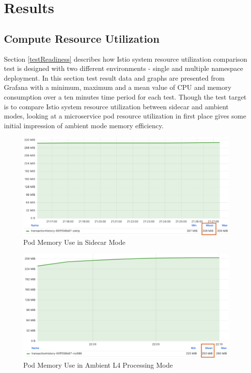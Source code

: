 \section{Results}
\label{resultSection}
\subsection{Compute Resource Utilization}
Section \ref{testReadiness} describes how Istio system resource utilization comparison test is designed with two different environments - single and multiple namespace deployment. In this section test result data and graphs are presented from Grafana with a minimum, maximum and a mean value of CPU and memory consumption over a ten minutes time period for each test. Though the test target is to compare Istio system resource utilization between sidecar and ambient modes, looking at a microservice pod resource utilization in first place gives some initial impression of ambient mode memory efficiency.

\begin{figure}[ht!]
  \centering
  \includegraphics[width=0.73\linewidth]{resources/sidecar-pod-mem.png}
  \caption{Pod Memory Use in Sidecar Mode}
  \label{result:podMemUseSidecar}
\end{figure}

\begin{figure}[ht!]
  \centering
  \includegraphics[width=0.73\linewidth]{resources/ambient-pod-mem.png}
  \caption{Pod Memory Use in Ambient L4 Processing Mode}
  \label{result:podMemUseAmbient}
\end{figure}


